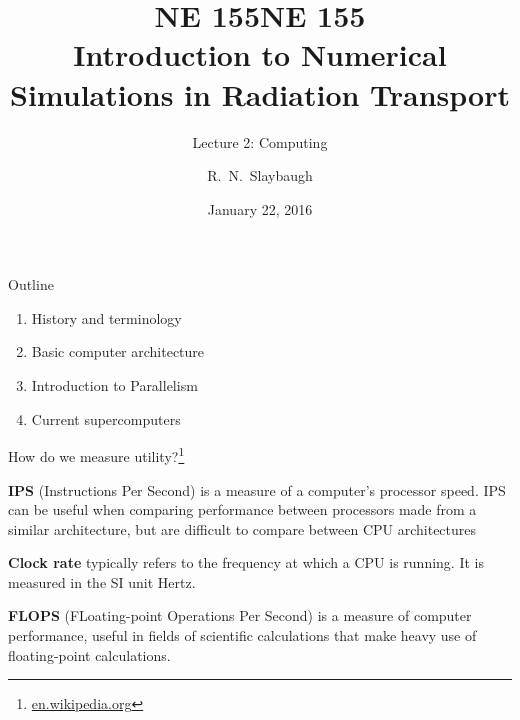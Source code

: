 \documentclass[xcolor=x11names,compress]{beamer}
\title{NE 155}
\author{R.\ N.\ Slaybaugh}
\date{January 22, 2016}
\renewcommand{\(}{\begin{columns}}
\renewcommand{\)}{\end{columns}}
\newcommand{\<}[1]{\begin{column}{#1}}
\renewcommand{\>}{\end{column}}
\begin{document}
\begin{frame}
\title{NE 155\\Introduction to Numerical Simulations in Radiation Transport}
\subtitle{Lecture 2: Computing}
\titlepage
\end{frame}

\begin{frame}{Outline}
\begin{enumerate}
\item History and terminology
\item Basic computer architecture
\item Introduction to Parallelism
\item Current supercomputers
\end{enumerate}
\end{frame}

\begin{frame}{How do we measure utility?\footnote{\href{en.wikipedia.org}{en.wikipedia.org}}}

\textbf{IPS} (Instructions Per Second) is a measure of a computer's processor speed. IPS can be useful when comparing performance between processors made from a similar architecture, but are difficult to compare between CPU architectures

\vspace*{1 em}
\textbf{Clock rate} typically refers to the frequency at which a CPU is running. It is measured in the SI unit Hertz.

\vspace*{1 em}
\textbf{FLOPS} (FLoating-point Operations Per Second) is a measure of computer performance, useful in fields of scientific calculations that make heavy use of floating-point calculations. 
\end{frame}
\end{document}
